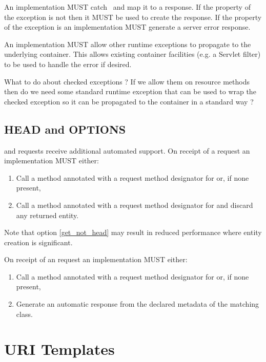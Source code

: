 An implementation MUST catch \WebAppExc\ and map it to a response. If the  property of the exception is not  then it MUST be used to create the response. If the  property of the exception is  an implementation MUST generate a server error response.

An implementation MUST allow other runtime exceptions to propagate to the underlying container. This allows existing container facilities (e.g. a Servlet filter) to be used to handle the error if desired.

\begin{ednote}What to do about checked exceptions ? If we allow them on resource methods then do we need some standard runtime exception that can be used to wrap the checked exception so it can be propagated to the container in a standard way ?\end{ednote}

\subsection{HEAD and OPTIONS}
\label{head_and_options}

 and  requests receive additional automated support. On receipt of a request an implementation MUST either:

\begin{enumerate}
\item Call a method annotated with a request method designator for  or, if none present,
\item\label{get_not_head} Call a method annotated with a request method designator for  and discard any returned entity.
\end{enumerate}

Note that option \ref{get_not_head} may result in reduced performance where entity creation is significant.

On receipt of an  request an implementation MUST either:

\begin{enumerate}
\item Call a method annotated with a request method designator for  or, if none present,
\item Generate an automatic response from the declared metadata of the matching class.
\end{enumerate}

\section{URI Templates}

